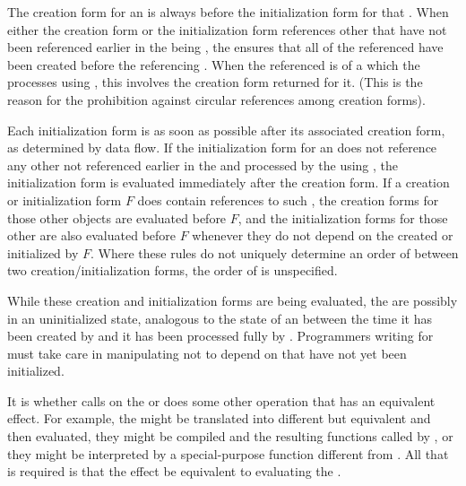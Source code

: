 The creation form for an  is always  before the
initialization form for that .  When either the creation form or
the initialization form references other  that have not been
referenced earlier in the  being , the  ensures
that all of the referenced  have been created before 
the referencing .  When the referenced  is of a  which
the  processes using ,
this involves 
the creation form returned for it.  (This is the reason for the
prohibition against circular references among creation forms).

Each initialization form is  as soon as possible after its
associated creation form, as determined by data flow.  If the
initialization form for an  does not reference any other 
not referenced earlier in the  and processed by 
the 
using
, the initialization form is evaluated immediately after
the creation form.  If a creation or initialization form $F$ does contain
references to such , the creation forms for those other objects
are evaluated before $F$, and the initialization forms for those other
 are also evaluated before $F$ whenever they do not depend on the
 created or initialized by $F$.  Where these rules do not uniquely
determine an order of  between two creation/initialization
forms, the order of  is unspecified.
 
  While these creation and initialization forms are being evaluated, the
   are possibly in an uninitialized state, 
analogous to the state
  of an  
between the time it has been created by 
  and it has been processed fully by 
.  Programmers
  writing  for 
 must take care in manipulating
   not to depend on 
 that have not yet been initialized.
 
  It is 
whether  calls  on the 
 or does some
  other operation that has an equivalent effect.  For example, the
   might be translated into different but equivalent 
 and
  then evaluated, they might be compiled and the resulting functions
  called by , 
or they might be interpreted by a special-purpose
function different from .  
All that is required is that the
  effect be equivalent to evaluating the .

